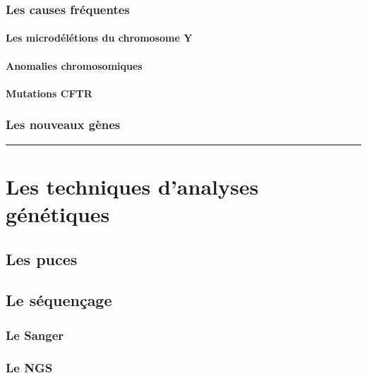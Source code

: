 \documentclass[12pt,twoside]{reedthesis}
\theoremstyle{definition}
\theoremstyle{definition}
\theoremstyle{remark}
\begin{document}
  \subsubsection{Les causes fréquentes}\label{les-causes-frequentes}
  
  \paragraph{Les microdélétions du chromosome
  Y}\label{les-microdeletions-du-chromosome-y}
  
  \paragraph{Anomalies chromosomiques}\label{anomalies-chromosomiques}
  
  \paragraph{Mutations CFTR}\label{mutations-cftr}
  
  \subsubsection{Les nouveaux gènes}\label{les-nouveaux-genes}
  
  \begin{center}\rule{0.5\linewidth}{\linethickness}\end{center}
  
  \section{Les techniques d'analyses
  génétiques}\label{les-techniques-danalyses-genetiques}
  
  \subsection{Les puces}\label{les-puces}
  
  \subsection{Le séquençage}\label{le-sequencage}
  
  \subsubsection{Le Sanger}\label{le-sanger}
  
  \subsubsection{Le NGS}\label{le-ngs}
  
\end{document}
